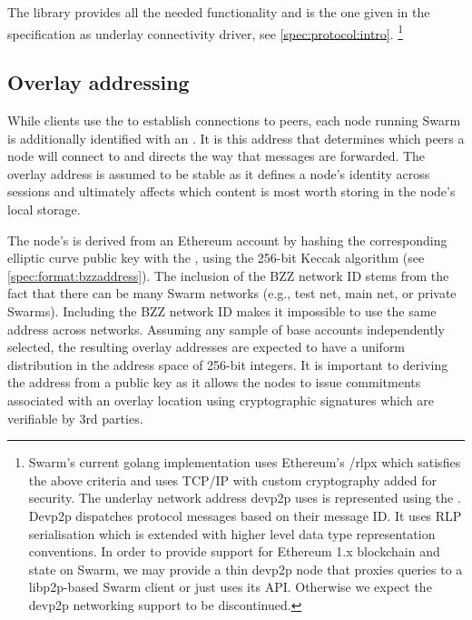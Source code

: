 The  library provides all the needed functionality and is the one given in the specification as underlay connectivity driver, see \ref{spec:protocol:intro}.%
%
\footnote{Swarm's current golang implementation uses Ethereum's /rlpx which satisfies the above criteria and uses TCP/IP with custom cryptography added for security. The underlay network address devp2p uses is represented using the . Devp2p dispatches protocol messages based on their message ID. It uses RLP serialisation which is extended with higher level data type representation conventions. In order to provide support for Ethereum 1.x blockchain and state on Swarm, we may provide a thin devp2p node that proxies queries to a libp2p-based Swarm client or just uses its API. Otherwise we expect the devp2p networking support to be discontinued.}

\subsection{Overlay addressing\statusgreen}\label{sec:overlay-addressing} 
\green{}

While clients use the  to establish connections to peers, each node running Swarm is additionally identified with an . It is this address that determines which peers a node will connect to and directs the way that messages are forwarded. The overlay address is assumed to be stable as it defines a node's identity across sessions and ultimately affects which content is most worth storing in the node's local storage.

The node's  is derived from an Ethereum account by hashing the corresponding elliptic curve public key with the , using the 256-bit Keccak algorithm (see \ref{spec:format:bzzaddress}). The inclusion of the BZZ network ID stems from the fact that there can be many Swarm networks (e.g., test net, main net, or private Swarms). Including the BZZ network ID makes it impossible to use the same address across networks. Assuming any sample of base accounts independently selected, the resulting overlay addresses are expected to have a uniform distribution in the address space of 256-bit integers. It is important to deriving the address from a public key as it allows the nodes to issue commitments associated with an overlay location using cryptographic signatures which are verifiable by 3rd parties. 

